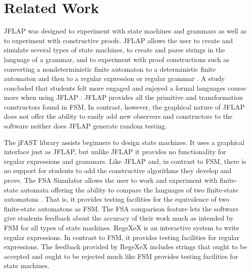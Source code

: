 \documentclass{eptcs}
\begin{document}
\section{Related Work}
JFLAP \cite{Rodger} was designed to experiment with state machines and grammars as well as to experiment with constructive proofs. JFLAP allows the user to create and simulate several types of state machines, to create and parse strings in the language of a grammar, and to experiment with proof constructions such as converting a nondeterministic finite automaton to a deterministic finite automaton and then to a regular expression or regular grammar \cite{Rodger}. A study concluded that students felt more engaged and enjoyed a formal languages course more when using JFLAP \cite{Rodger}. JFLAP provides all the primitive and transformation constructors found in \textsf{FSM}. In contrast, however, the graphical nature of JFLAP does not offer the ability to easily add new observers and constructors to the software neither does JFLAP generate random testing.

The jFAST \cite{White} library assists beginners to design state machines. It uses a graphical interface just as JFLAP, but unlike JFLAP it provides no functionality for regular expressions and grammars. Like JFLAP and, in contrast to \textsf{FSM}, there is no support for students to add the constructive algorithms they develop and prove. The FSA Simulator allows the user to work and experiment with finite-state automata offering the ability to compare the languages of two finite-state automatons \cite{Grinder}. That is, it provides testing facilities for the equivalence of two finite-state automatons as \textsf{FSM}. The FSA comparison feature lets the software give students feedback about the accuracy of their work much as intended by \textsf{FSM} for all types of state machines. RegeXeX \cite{Brown} is an interactive system to write regular expressions. In contrast to \textsf{FSM}, it provides testing facilities for regular expressions. The feedback provided by RegeXeX includes strings that ought to be accepted and ought to be rejected much like \textsf{FSM} provides testing facilities for state machines.
\end{document}

